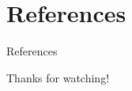 \documentclass[10pt,aspectratio=169]{beamer}
\begin{document}
\section*{References}
\begin{frame}{References}
    \printbibliography
\end{frame}

\begin{frame}
    \begin{center}
        \Huge{Thanks for watching!}
    \end{center}
\end{frame}
\end{document}
